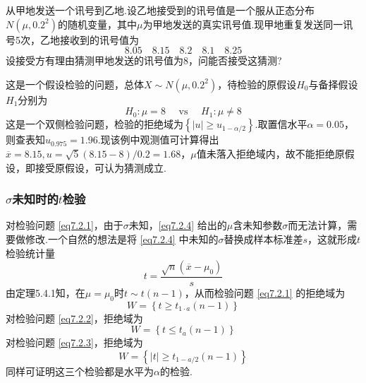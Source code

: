 \begin{example}\label{exam7.2.1}
从甲地发送一个讯号到乙地.设乙地接受到的讯号值是一个服从正态分布$N(\mu ,0.2^{2})$的随机变量，其中$\mu $为甲地发送的真实讯号值.现甲地重复发送同一讯号5次，乙地接收到的讯号值为
\[8.05 \quad 8.15 \quad 8.2 \quad 8.1 \quad 8.25\]
设接受方有理由猜测甲地发送的讯号值为8，问能否接受这猜测?
\end{example}
\begin{solution}
	这是一个假设检验的问题，总体$X \sim N \left( \mu , 0.2 ^ { 2 } \right)$，待检验的原假设$H_{0}$与备择假设$H_{1}$分别为
	\[H _ { 0 } : \mu = 8 \quad \text { vs } \quad H _ { 1 } : \mu \neq 8\]
	这是一个双侧检验问题，检验的拒绝域为$\left\{ | u | \geq u _ { 1 - \alpha / 2} \right\}$.取置信水平$\alpha=0.05$，则查表知$u_{0.975}=1.96$.现该例中观测值可计算得出$\overline{x}=8.15,u=\sqrt{5}\left(8.15-8\right)/0.2=1.68$，$\mu $值未落入拒绝域内，故不能拒绝原假设，即接受原假设，可认为猜测成立.
	
\end{solution}
\subsubsection{$\sigma$未知时的$t$检验}

对检验问题 \eqref{eq7.2.1}，由于$\sigma$未知，\eqref{eq7.2.4} 给出的$\mu $含未知参数$\sigma$而无法计算，需要做修改.一个自然的想法是将 \eqref{eq7.2.4} 中未知的$\sigma$替换成样本标准差$s$，这就形成$t$检验统计量
\begin{equation}\label{eq7.2.9}
t = \frac { \sqrt { n } \left( \overline { x } - \mu _ { 0 } \right) } { s }
\end{equation}
由定理5.4.1知，在$\mu=\mu_{ 0 }$时$t\sim t(n-1)$，从而检验问题 \eqref{eq7.2.1} 的拒绝域为
\begin{equation}\label{eq7.2.10}
W = \left\{ t \geq t _ { 1 \cdot a } ( n - 1 ) \right\}
\end{equation}
对检验问题 \eqref{eq7.2.2}，拒绝域为
\begin{equation}\label{eq7.2.11}
W = \left\{ t \leq t _ { a } ( n - 1 ) \right\}
\end{equation}
对检验问题 \eqref{eq7.2.3}，拒绝域为
\begin{equation}\label{eq7.2.12}
W=\left\{\left| t\right|\geq t_{1-a/2}\left(n-1\right)\right\}
\end{equation}
同样可证明这三个检验都是水平为$\alpha$的检验.


